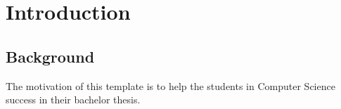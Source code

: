 
\section{Introduction}
\subsection{Background}
The motivation of this template is to help the students in Computer Science success in their bachelor thesis.